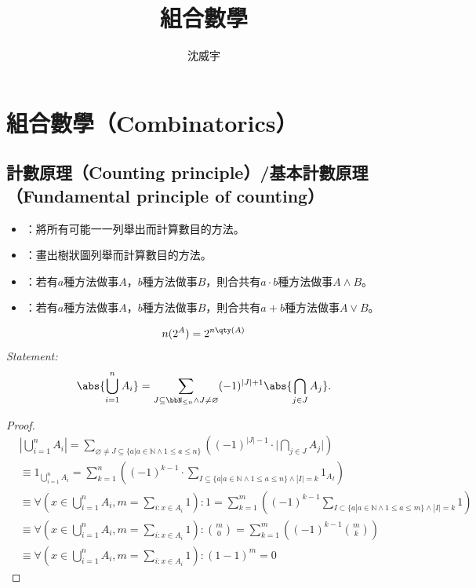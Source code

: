 \documentclass[a4paper,12pt]{report}
\begin{document}
\title{組合數學}
\author{沈威宇}
\date{\temtoday}
\titletocdoc
\section{組合數學（Combinatorics）}
\subsection{計數原理（Counting principle）/基本計數原理（Fundamental principle of counting）}
\begin{itemize}
\item {}：將所有可能一一列舉出而計算數目的方法。
\item {}：畫出樹狀圖列舉而計算數目的方法。
\item {}：若有$a$種方法做事$A$，$b$種方法做事$B$，則合共有$a\cdot b$種方法做事$A\land B$。
\item {}：若有$a$種方法做事$A$，$b$種方法做事$B$，則合共有$a+b$種方法做事$A\lor B$。
\end{itemize}
\[n(2^A)=2^{n\qty(A)}\]
\textit{Statement:}
\[\abs{\bigcup_{i=1}^nA_i}=\sum_{J\subseteq\bbN_{\leq n}\land J\neq\varnothing}(-1)^{|J|+1}\abs{\bigcap_{j\in J}A_j}.\]

\begin{proof}
\[
\begin{aligned}
& \left|\bigcup _{i=1}^n A_i\right| = \sum _{\varnothing \neq J\subseteq \{a|a \in \mathbb{N} \wedge 1\leq a\leq n\}}\left((-1)^{|J|-1}\cdot{\Biggl |}\bigcap _{j\in J}A_j{\Biggr |}\right) \\
& \equiv 1_{\bigcup _{i=1}^n A_i} = \sum _{k=1}^{n}\left((-1)^{k-1}\cdot\sum _{I\subseteq \{a|a \in \mathbb{N} \wedge 1\leq a\leq n\} \wedge |I|=k}1_{A_{I}}\right) \\
& \equiv \forall \left( x \in \bigcup_{i=1}^n A_i, m = \sum_{i: x \in A_i}1\right): 1 = \sum _{k=1}^{m}\left((-1)^{k-1}\sum _{I\subset \{a|a \in \mathbb{N} \wedge 1\leq a\leq m\} \wedge |I|=k}1\right) \\
& \equiv \forall \left( x \in \bigcup_{i=1}^n A_i, m = \sum_{i: x \in A_i}1\right): {\binom{m}{0}} = \sum _{k=1}^{m}\left((-1)^{k-1}{\binom {m}{k}}\right) \\
& \equiv \forall \left( x \in \bigcup_{i=1}^n A_i, m = \sum_{i: x \in A_i}1\right): (1-1)^m = 0
\end{aligned}
\]
\end{proof}
\end{document}
